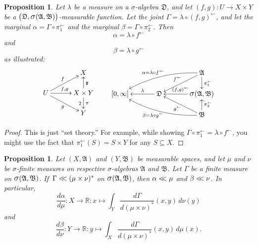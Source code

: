 \documentclass[
twoside=true,
paper=letter,
fontsize=9pt,
pagesize=auto,
leqno,
openany,
headsepline,
overfullrule,
]{scrbook}
\theoremstyle{plain}
\theoremstyle{plain}
\newtheorem{prop}[thm]{Proposition}
\theoremstyle{definition}
\theoremstyle{bfnoteitalic}
\theoremstyle{bfnoteroman}
\newcommand{\sigalg}[1]{\mathfrak{#1}}
\newcommand{\sagb}{\mathop{\hbox{\large{$\sigma$}}}\nolimits}
\newcommand{\textsigma}{\hbox{\large{$\sigma$}}\kern-1pt}
\newcommand{\preimage}[1]{#1^{\leftarrow}}
\newcommand{\R}{\mathbb{R}}
\newcommand{\sigmaalgebra}{\sigalg{A}}
\newcommand{\sigmaalgebraii}{\sigalg{B}}
\newcommand{\productsig}[2]{\sagb(#1,#2)}
\newcommand{\funcf}{f}
\newcommand{\funcg}{g}
\newcommand{\measurespace}{X}
\newcommand{\measurespaceii}{Y}
\newcommand{\mspaceelt}{x}
\newcommand{\mspaceeltii}{y}
\newcommand{\abscont}{\mathrel{< \kern-3.5pt <}}
\newcommand{\measure}{\mu}
\newcommand{\measmu}{\mu}
\newcommand{\measureii}{\nu}
\newcommand{\measnu}{\nu}
\newcommand{\measlambda}{\lambda}
\newcommand{\projectionone}{\pi_1}
\newcommand{\projectiontwo}{\pi_2}
\newcommand{\uspace}{U}%
\newcommand{\uspacesig}{\sigalg{D}}
\newcommand{\joint}{\Gamma}%
\newcommand{\measonprod}{\Gamma}%
\newcommand{\marginalone}{\alpha}%
\newcommand{\marginaltwo}{\beta}%
\begin{document}
\begin{prop}\label{induced_marginals}
Let $\measlambda$ be a measure on a \textsigma-algebra
$\uspacesig$,
and let
$(\funcf,\funcg):\uspace\to \measurespace  \times \measurespaceii $
be a
$\bigl(\uspacesig,\productsig{\sigmaalgebra}{\sigmaalgebraii}\bigr)$\hyp{}measurable
function.
Let the joint
$\measonprod 
=
\measlambda\circ\preimage{(\funcf,\funcg)}$,
and let the marginal
$\marginalone
=
\measonprod\circ\preimage{\projectionone}$
and the marginal
$\marginaltwo
=
\measonprod\circ\preimage{\projectiontwo}$.
Then
\[
\marginalone
= 
\measlambda\circ\preimage{\funcf}
\]
and
\[
\marginaltwo
=
\measlambda\circ\preimage{\funcg}
\]
as illustrated:
\[
\xymatrix@R=16pt@C=30pt{ 
 & \measurespace
 \\
 \uspace 
 \ar[ur]^{\funcf}
 \ar[dr]_{\funcg}
 \ar[r]^{\funcf, \funcg} &
 \measurespace \times \measurespaceii  \ar[u]_\projectionone \ar[d]^\projectiontwo
 \\
 & \measurespaceii  \\
}
\qquad
\xymatrix@R=16pt@C=34pt{ 
 & & \sigmaalgebra
 \ar[dl]_{\preimage{\funcf}}
 \ar[d]^{\preimage{\projectionone}}
 \ar@/_10pt/[lld]_{\makebox[0pt][r]{$\scriptstyle{\marginalone} = $}\measlambda\circ\preimage{\funcf}}
 \\
 [0,\infty] & \uspacesig \ar[l]_-{\measlambda} & 
 \productsig{\sigmaalgebra}{\sigmaalgebraii} 
 \ar[l]_{\preimage{(\funcf,\funcg)}}
 \\
 & & \sigmaalgebraii
  \ar[u]_{\preimage{\projectiontwo}}
  \ar[ul]^{\preimage{\funcg}}
  \ar@/^10pt/[llu]^{\makebox[0pt][r]{$\scriptstyle{\marginaltwo} = $}\measlambda\circ\preimage{\funcg}}
  \\
}
\]
\end{prop}

\begin{proof}
This is just ``set theory.''  For example, while showing
$\measonprod \circ \preimage{\projectionone}
=
\measlambda\circ\preimage{\funcf}$,
you might use the fact that 
$\preimage{\projectionone}(S) = S\times \measurespaceii $ for any $S\subseteq \measurespace $.
\end{proof}




\begin{prop}\label{marginal_abscont}
Let 
$(\measurespace, \sigmaalgebra)$
and
$(\measurespaceii, \sigmaalgebraii)$
be measurable spaces, and let $\measure$ and $\measureii$
be \textsigma-finite measures on respective \textsigma-algebras 
$\sigmaalgebra$ and $\sigmaalgebraii$.
Let $\measonprod$ be a finite measure on 
$\productsig{\sigmaalgebra}{\sigmaalgebraii}$. 
If $\,\measonprod \abscont (\measure\times\measureii)^*$ on
$\productsig{\sigmaalgebra}{\sigmaalgebraii}$, 
then 
$\marginalone\abscont\measure$
and
$\marginaltwo\abscont\measureii$.
In particular,
\[
\frac{d \marginalone}
{d\measure}
: \measurespace\to\R :
\mspaceelt\mapsto
\int_{\measurespaceii}
\frac{d\joint}{d(\measmu\times\measnu)^*}
(\mspaceelt,\mspaceeltii)
\,d\measureii(\mspaceeltii)
\]
and
\[
\frac{d \marginaltwo}
{d\measureii}
: \measurespaceii\to\R :
\mspaceeltii\mapsto
\int_{\measurespace}
\frac{d\joint}{d(\measmu\times\measnu)^*}
(\mspaceelt,\mspaceeltii)\,d\measure(\mspaceelt).
\]
\end{prop}
\end{document}
